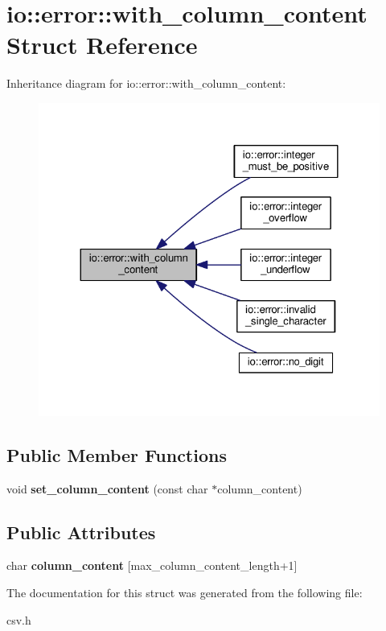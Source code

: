 \section{io\+:\+:error\+:\+:with\+\_\+column\+\_\+content Struct Reference}
\label{structio_1_1error_1_1with__column__content}


Inheritance diagram for io\+:\+:error\+:\+:with\+\_\+column\+\_\+content\+:\nopagebreak
\begin{figure}[H]
\begin{center}
\leavevmode
\includegraphics[width=324pt]{structio_1_1error_1_1with__column__content__inherit__graph}
\end{center}
\end{figure}
\subsection*{Public Member Functions}
\begin{DoxyCompactItemize}
\item 
void {\bfseries set\+\_\+column\+\_\+content} (const char $\ast$column\+\_\+content)\label{structio_1_1error_1_1with__column__content_ae7375310dc02425cb3cc4115b3ac8d6a}

\end{DoxyCompactItemize}
\subsection*{Public Attributes}
\begin{DoxyCompactItemize}
\item 
char {\bfseries column\+\_\+content} [max\+\_\+column\+\_\+content\+\_\+length+1]\label{structio_1_1error_1_1with__column__content_a8587779769fbfb40155abb362137a523}

\end{DoxyCompactItemize}


The documentation for this struct was generated from the following file\+:\begin{DoxyCompactItemize}
\item 
csv.\+h\end{DoxyCompactItemize}
